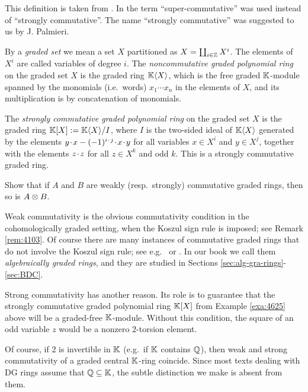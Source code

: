 This definition is taken from \cite{Ye9}. In \cite{YeZh3} the term 
``super-commutative'' was used instead of ``strongly commutative''. 
The name ``strongly commutative'' was suggested to us by J. Palmieri. 

\begin{exa} \label{exa:4625}
By a {\em graded set}%
we mean a set $X$ partitioned as 
$X = \coprod_{i \in \mathbb{Z}} X^i$. 
The elements of $X^i$ are called variables of degree $i$. The 
{\em noncommutative graded polynomial ring}%
on the graded set $X$ is the graded ring $\mathbb{K} \langle X \rangle$, which is 
the free graded $\mathbb{K}$-module spanned by 
the monomials (i.e.\ words) $x_1 \cdots x_n$ in the elements of $X$, and its 
multiplication is by concatenation of monomials. 

The {\em strongly commutative graded polynomial ring}%
on the graded set $X$ is the graded ring 
$\mathbb{K}[X] := \mathbb{K} \langle X \rangle / I$,
where $I$ is the two-sided ideal of $\mathbb{K} \langle X \rangle$ generated by the elements 
$y \mspace{1.5mu}{\cdot}\mspace{1.5mu} x - (-1)^{i \mspace{1.5mu}{\cdot}\mspace{1.5mu} j} \mspace{1.5mu}{\cdot}\mspace{1.5mu} x \mspace{1.5mu}{\cdot}\mspace{1.5mu} y$ for all variables 
$x \in X^i$ and $y \in X^j$, together with the elements 
$z \mspace{1.5mu}{\cdot}\mspace{1.5mu} z$ for all $z \in X^k$ and odd $k$. 
This is a strongly commutative graded ring. 
\end{exa}

\begin{exer} \label{exer:4105}
Show that if $A$ and $B$ are weakly (resp.\ strongly) commutative graded rings, 
then so is $A \otimes B$. 
\end{exer}

\begin{rem} \label{rem:2516}
Weak commutativity is the obvious commutativity condition in the cohomologically
graded setting, when the Koszul sign rule%
is imposed; see Remark 
\ref{rem:4103}. Of course there are many instances of commutative graded rings 
that do not involve the Koszul sign rule; see e.g.\ \cite{Eis} or \cite{Mats}. 
In our book we call them {\em algebraically graded rings}, and they are studied 
in Sections \ref{sec:alg-gra-rings}-\ref{sec:BDC}.

Strong commutativity has another reason. Its role is to guarantee that the 
strongly commutative graded polynomial ring $\mathbb{K}[X]$ from Example 
\ref{exa:4625} above will be a graded-free $\mathbb{K}$-module. Without this 
condition, the square of an odd variable $z$ would be a nonzero $2$-torsion 
element. 

Of course, if $2$ is invertible in $\mathbb{K}$ (e.g.\ if $\mathbb{K}$ contains $\mathbb{Q}$), then 
weak and strong commutativity of a graded central $\mathbb{K}$-ring coincide. Since 
most texts dealing with DG rings assume that $\mathbb{Q} \subseteq \mathbb{K}$, the subtle 
distinction we make is absent from them. 
\end{rem}

